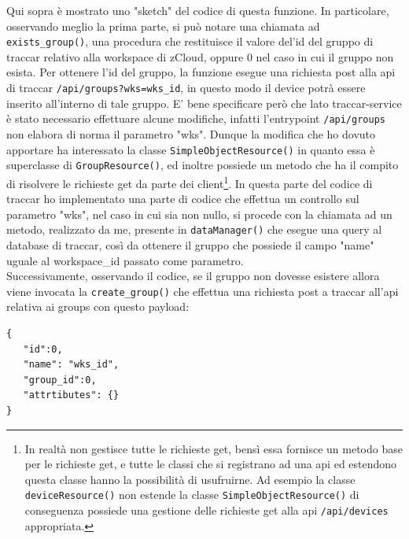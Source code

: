 \documentclass[a4paper,titlepage,12pt]{book}
\begin{document}
{\noindent Qui sopra è mostrato uno "sketch" del codice di questa funzione. In particolare, osservando meglio la prima parte, si può notare una chiamata ad \texttt{exists\_group()}, una procedura che restituisce il valore del'id del gruppo di traccar relativo alla workspace di zCloud, oppure 0 nel caso in cui il gruppo non esista. Per ottenere l'id del gruppo, la funzione esegue una richiesta post alla api di traccar \texttt{/api/groups?wks=wks\_id}, in questo modo il device potrà essere inserito all'interno di tale gruppo. E' bene specificare però che lato traccar-service è stato necessario effettuare alcune modifiche, infatti l'entrypoint \texttt{/api/groups} non elabora di norma il parametro "wks". Dunque la modifica che ho dovuto apportare ha interessato la classe \texttt{SimpleObjectResource()} in quanto essa è superclasse di \texttt{GroupResource()}, ed inoltre possiede un metodo che ha il compito di risolvere le richieste get da parte dei client\footnote{In realtà non gestisce tutte le richieste get, bensì essa fornisce un metodo base per le richieste get, e tutte le classi che si registrano ad una api ed estendono questa classe hanno la possibilità di usufruirne. Ad esempio la classe \texttt{deviceResource()} non estende la classe \texttt{SimpleObjectResource()} di conseguenza possiede una gestione delle richieste get alla api \texttt{/api/devices} appropriata.}. In questa parte del codice di traccar ho implementato una parte di codice che effettua un controllo sul parametro "wks", nel caso in cui sia non nullo, si procede con la chiamata ad un metodo, realizzato da me, presente in \texttt{dataManager()} che esegue una query al database di traccar, così da ottenere il gruppo che possiede il campo "name" uguale al workspace\_id passato come parametro. \\
Successivamente, osservando il codice, se il gruppo non dovesse esistere allora viene invocata la \texttt{create\_group()} che effettua una richiesta post a traccar all'api relativa ai groups con questo payload:
\begin{verbatim}
{
   "id":0,
   "name": "wks_id",
   "group_id":0,
   "attrtibutes": {}
}

\end{verbatim}

}
\end{document}

